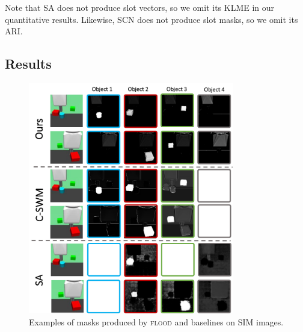 \documentclass{article}
\begin{document}
Note that SA does not produce slot vectors, so we omit its KLME in our quantitative results. Likewise, SCN does not produce slot masks, so we omit its ARI.





\subsection{Results}
\begin{figure}
  \centering
  \includegraphics[width=9cm]{figs/qual_sim.pdf}
  \caption{Examples of masks produced by \textsc{flood} and baselines on SIM images.}
  \label{fig:qual_sim}
\end{figure}
\end{document}
